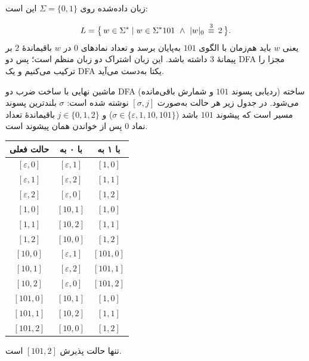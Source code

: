 زبان داده‌شده روی $\Sigma = \{0,1\}$ این است:

\[
L = \bigl\{\, w \in \Sigma^* \mid w \in \Sigma^* 101 \ \land\ |w|_0 \,\overset{3}{\equiv}\, 2 \,\bigr\}.
\]
یعنی $w$ باید هم‌زمان با الگوی $101$ به‌پایان برسد و تعداد نمادهای $0$ در $w$ باقیماندهٔ $2$ بر پیمانهٔ $3$ داشته باشد.
این زبان اشتراک دو زبان منظم است؛ پس دو DFA مجزا را ترکیب می‌کنیم و یک DFA یکتا به‌دست می‌آید.

ماشین نهایی با ساخت ضرب دو DFA (ردیابی پسوند $101$ و شمارش باقی‌مانده) ساخته می‌شود.
در جدول زیر هر حالت به‌صورت $[\sigma,j]$ نوشته شده است: $\sigma$ بلندترین پسوند مسیر است که پیشوند $101$ باشد ($\sigma\in\{\varepsilon,1,10,101\}$) و $j\in\{0,1,2\}$ باقیماندهٔ تعداد نماد $0$ پس از خواندن همان پیشوند است.
\begin{center}
\begin{tabular}{|c|c|c|}
\hline
حالت فعلی & با ۰ به & با ۱ به \\
\hline
$[\varepsilon,0]$ & $[\varepsilon,1]$ & $[1,0]$ \\
$[\varepsilon,1]$ & $[\varepsilon,2]$ & $[1,1]$ \\
$[\varepsilon,2]$ & $[\varepsilon,0]$ & $[1,2]$ \\
\hline
$[1,0]$ & $[10,1]$ & $[1,0]$ \\
$[1,1]$ & $[10,2]$ & $[1,1]$ \\
$[1,2]$ & $[10,0]$ & $[1,2]$ \\
\hline
$[10,0]$ & $[\varepsilon,1]$ & $[101,0]$ \\
$[10,1]$ & $[\varepsilon,2]$ & $[101,1]$ \\
$[10,2]$ & $[\varepsilon,0]$ & $[101,2]$ \\
\hline
$[101,0]$ & $[10,1]$ & $[1,0]$ \\
$[101,1]$ & $[10,2]$ & $[1,1]$ \\
$[101,2]$ & $[10,0]$ & $[1,2]$ \\
\hline
\end{tabular}
\end{center}
تنها حالت پذیرش $[101,2]$ است.

